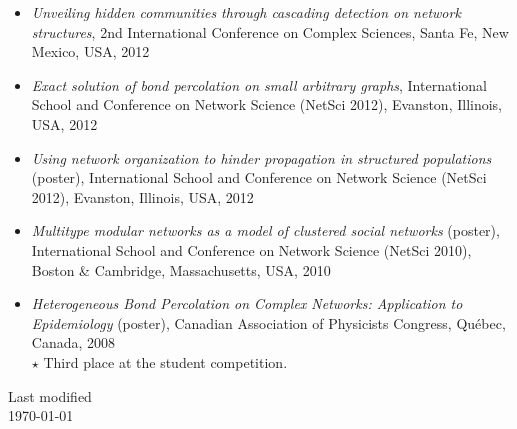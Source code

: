\documentclass[11pt]{article}
\begin{document}
\begin{itemize}[itemsep=0.5em]
%
  \item \textit{Unveiling hidden communities through cascading detection on network structures}, 2nd International Conference on Complex Sciences, Santa Fe, New Mexico, USA, 2012
%
  \item \textit{Exact solution of bond percolation on small arbitrary graphs}, International School and Conference on Network Science (NetSci 2012), Evanston, Illinois, USA, 2012
%
  \item \textit{Using network organization to hinder propagation in structured populations} (poster), International School and Conference on Network Science (NetSci 2012), Evanston, Illinois, USA, 2012
%
  \item \textit{Multitype modular networks as a model of clustered social networks} (poster), International School and Conference on Network Science (NetSci 2010), Boston \& Cambridge, Massachusetts, USA, 2010
%
  \item \textit{Heterogeneous Bond Percolation on Complex Networks: Application to Epidemiology} (poster), Canadian Association of Physicists Congress, Qu\'ebec, Canada, 2008\\
  {\small $\star$ Third place at the student competition.}\\
%
\end{itemize}
%
%
%
%
%
\vfill
%
\begin{flushright}
  \tiny Last modified\\ \today
\end{flushright}
%
\end{document}

